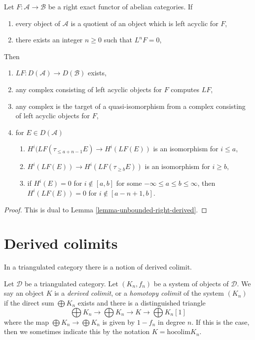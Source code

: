 \begin{lemma}
\label{lemma-unbounded-left-derived}
Let $F : \mathcal{A} \to \mathcal{B}$ be a right exact functor of
abelian categories. If
\begin{enumerate}
\item every object of $\mathcal{A}$ is a quotient of an object
which is left acyclic for $F$,
\item there exists an integer $n \geq 0$ such that $L^nF = 0$,
\end{enumerate}
Then
\begin{enumerate}
\item $LF : D(\mathcal{A}) \to D(\mathcal{B})$ exists,
\item any complex consisting of left acyclic objects for $F$ computes $LF$,
\item any complex is the target of a quasi-isomorphism from a complex
consisting of left acyclic objects for $F$,
\item for $E \in D(\mathcal{A})$
\begin{enumerate}
\item $H^i(LF(\tau_{\leq a + n - 1}E) \to H^i(LF(E))$ is an isomorphism
for $i \leq a$,
\item $H^i(LF(E)) \to H^i(LF(\tau_{\geq b}E))$ is an isomorphism
for $i \geq b$,
\item if $H^i(E) = 0$ for $i \not \in [a, b]$ for some
$-\infty \leq a \leq b \leq \infty$, then $H^i(LF(E)) = 0$
for $i \not \in [a - n + 1, b]$.
\end{enumerate}
\end{enumerate}
\end{lemma}

\begin{proof}
This is dual to Lemma \ref{lemma-unbounded-right-derived}.
\end{proof}






\section{Derived colimits}
\label{section-derived-colimit}

\noindent
In a triangulated category there is a notion of derived colimit.

\begin{definition}
\label{definition-derived-colimit}
Let $\mathcal{D}$ be a triangulated category.
Let $(K_n, f_n)$ be a system of objects of $\mathcal{D}$.
We say an object $K$ is a {\it derived colimit}, or a
{\it homotopy colimit} of the system $(K_n)$ if
the direct sum $\bigoplus K_n$ exists and there is a distinguished triangle
$$
\bigoplus K_n \to \bigoplus K_n \to K \to \bigoplus K_n[1]
$$
where the map $\bigoplus K_n \to \bigoplus K_n$ is given
by $1 - f_n$ in degree $n$. If this is the
case, then we sometimes indicate this by the notation
$K = \text{hocolim} K_n$.
\end{definition}

